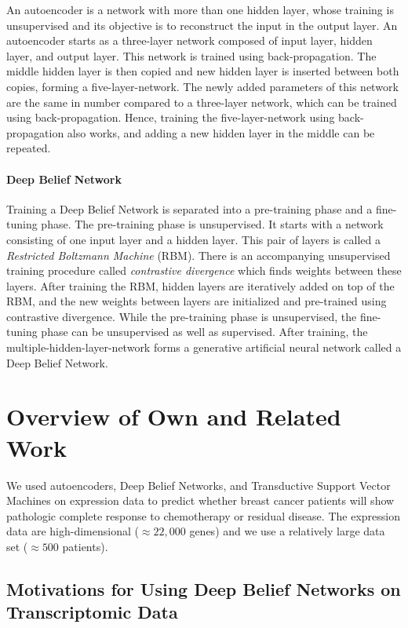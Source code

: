 An autoencoder is a network with more than one hidden layer, whose
training is unsupervised and its objective is to reconstruct the input
in the output layer. An autoencoder starts as a three-layer network
composed of input layer, hidden layer, and output layer. This network
is trained using back-propagation. The middle hidden layer is then
copied and new hidden layer is inserted between both copies, forming
a five-layer-network. The newly added parameters of this network are
the same in number compared to a three-layer network, which can be
trained using back-propagation. Hence, training the five-layer-network
using back-propagation also works, and adding a new hidden layer in
the middle can be repeated.

\paragraph{Deep Belief Network}

Training a Deep Belief Network is separated into a pre-training phase
and a fine-tuning phase. The pre-training phase is unsupervised. It
starts with a network consisting of one input layer and a hidden layer.
This pair of  layers is called a \emph{Restricted Boltzmann Machine}
(RBM). There is an accompanying unsupervised training
procedure called \emph{contrastive divergence}
which finds weights between these layers. After training the RBM,
hidden layers are iteratively added on top of the RBM, and the new
weights between layers are initialized and pre-trained using contrastive
divergence. While the pre-training phase is unsupervised, the fine-tuning
phase can be unsupervised as well as supervised. After training, the
multiple-hidden-layer-network forms a generative artificial neural
network called a Deep Belief Network.

\section{Overview of Own and Related Work}

We used autoencoders, Deep Belief Networks, and Transductive Support
Vector Machines on expression data to predict whether breast cancer
patients will show pathologic complete response to chemotherapy or
residual disease. The expression data are high-dimensional ($\approx22,000$
genes) and we use a relatively large data set ($\approx500$ patients).

\subsection{Motivations for Using Deep Belief Networks on Transcriptomic Data}


